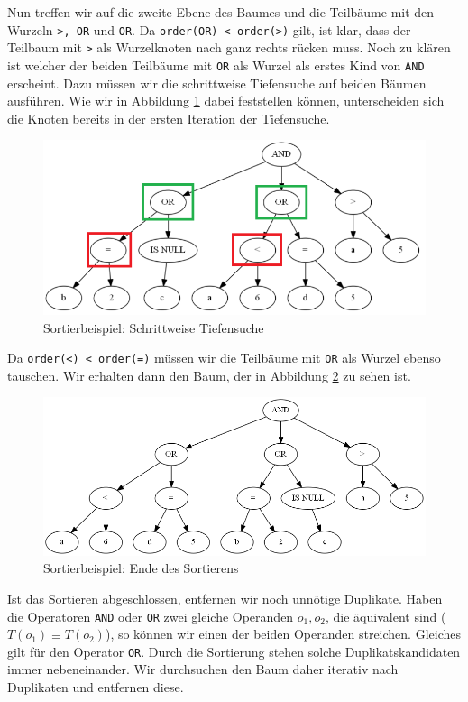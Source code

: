 Nun treffen wir auf die zweite Ebene des Baumes und die Teilbäume mit den Wurzeln \verb|>, OR| und \verb|OR|. Da \verb|order(OR) < order(>)| gilt, ist klar, dass der Teilbaum mit \verb|>| als Wurzelknoten nach ganz rechts rücken muss. Noch zu klären ist welcher der beiden Teilbäume mit \verb|OR| als Wurzel als erstes Kind von \verb|AND| erscheint. Dazu müssen wir die schrittweise Tiefensuche auf beiden Bäumen ausführen. Wie wir in Abbildung \ref{fig:sort_step2} dabei feststellen können, unterscheiden sich die Knoten bereits in der ersten Iteration der Tiefensuche.

\begin{figure}[H]
\centering
\includegraphics[scale=0.55]{Bilder/sort_step2.png}
\caption{Sortierbeispiel: Schrittweise Tiefensuche}
\label{fig:sort_step2}
\end{figure}

 Da \verb|order(<) < order(=)| müssen wir die Teilbäume mit \verb|OR| als Wurzel ebenso tauschen. Wir erhalten dann den Baum, der in Abbildung \ref{fig:sort_zwischen4} zu sehen ist.

\begin{figure}[H]
\centering
\includegraphics[scale=0.55]{Bilder/sort_zwischen4.png}
\caption{Sortierbeispiel: Ende des Sortierens}
\label{fig:sort_zwischen4}
\end{figure}

Ist das Sortieren abgeschlossen, entfernen wir noch unnötige Duplikate. Haben die Operatoren \verb|AND| oder \verb|OR| zwei gleiche Operanden $o_1,o_2$, die äquivalent sind ($T(o_1) \equiv T(o_2)$), so können wir einen der beiden Operanden streichen. Gleiches gilt für den Operator \verb|OR|. Durch die Sortierung stehen solche Duplikatskandidaten immer nebeneinander. Wir durchsuchen den Baum daher iterativ nach Duplikaten und entfernen diese.

